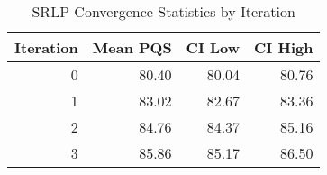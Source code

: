 \begin{table}[htbp]
\centering
\caption{SRLP Convergence Statistics by Iteration}
\label{tab:convergence}
\begin{tabular}{rrrr}
\toprule
Iteration & Mean PQS & CI Low & CI High \\
\midrule
0 & 80.40 & 80.04 & 80.76 \\
1 & 83.02 & 82.67 & 83.36 \\
2 & 84.76 & 84.37 & 85.16 \\
3 & 85.86 & 85.17 & 86.50 \\
\bottomrule
\end{tabular}
\end{table}